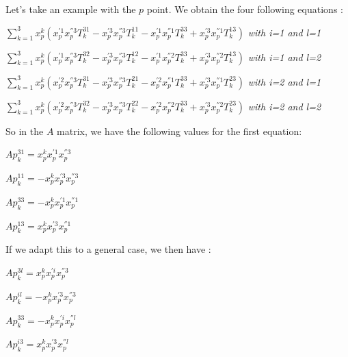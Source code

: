 \documentclass{report}
\begin{document}
\newpage
Let's take an example with the $p$ point. 
We obtain the four following equations : 
\begin{center}
 $ \displaystyle { \sum_{k = 1}^{3}} x_{p}^{k}(x_{p}^{'1}x_{p}^{''3}T_{k}^{31} - x_{p}^{'3}x_{p}^{''3}T_{k}^{11} - x_{p}^{'1}x_{p}^{''1}T_{k}^{33} + x_{p}^{'3}x_{p}^{''1}T_{k}^{13})$  \textit{with i=1 and l=1}
\end{center}
\begin{center}
 $ \displaystyle { \sum_{k = 1}^{3}} x_{p}^{k}(x_{p}^{'1}x_{p}^{''3}T_{k}^{32} - x_{p}^{'3}x_{p}^{''3}T_{k}^{12} - x_{p}^{'1}x_{p}^{''2}T_{k}^{33} + x_{p}^{'3}x_{p}^{''2}T_{k}^{13})$  \textit{with i=1 and l=2} 
\end{center}
\begin{center}
 $ \displaystyle { \sum_{k = 1}^{3}} x_{p}^{k}(x_{p}^{'2}x_{p}^{''3}T_{k}^{31} - x_{p}^{'3}x_{p}^{''3}T_{k}^{21} - x_{p}^{'2}x_{p}^{''1}T_{k}^{33} + x_{p}^{'3}x_{p}^{''1}T_{k}^{23})$  \textit{with i=2 and l=1} 
\end{center}
\begin{center}
 $ \displaystyle { \sum_{k = 1}^{3}} x_{p}^{k}(x_{p}^{'2}x_{p}^{''3}T_{k}^{32} - x_{p}^{'3}x_{p}^{''3}T_{k}^{22} - x_{p}^{'2}x_{p}^{''2}T_{k}^{33} + x_{p}^{'3}x_{p}^{''2}T_{k}^{23})$  \textit{with i=2 and l=2} 
\end{center}

So in the $A$ matrix, we have the following values for the first equation: 
\begin{center}
$Ap_{k}^{31} = x_{p}^{k}x_{p}^{'1}x_{p}^{''3}$
\end{center}
\begin{center}
$Ap_{k}^{11} = - x_{p}^{k}x_{p}^{'3}x_{p}^{''3}$
\end{center}
\begin{center}
$Ap_{k}^{33} = -x_{p}^{k} x_{p}^{'1}x_{p}^{''1}$
\end{center}
\begin{center}
$Ap_{k}^{13} = x_{p}^{k}x_{p}^{'3}x_{p}^{''1}$
\end{center}

If we adapt this to a general case, we then have  : 
\begin{center}
$Ap_{k}^{3l} = x_{p}^{k}x_{p}^{'i}x_{p}^{''3}$
\end{center}
\begin{center}
$Ap_{k}^{il} = - x_{p}^{k}x_{p}^{'3}x_{p}^{''3}$
\end{center}
\begin{center}
$Ap_{k}^{33} = -x_{p}^{k} x_{p}^{'i}x_{p}^{''l}$
\end{center}
\begin{center}
$Ap_{k}^{i3} = x_{p}^{k}x_{p}^{'3}x_{p}^{''l}$
\end{center}
\end{document}
